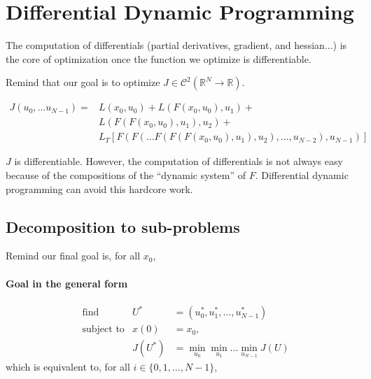 \documentclass{report}
\begin{document}
\chapter{Differential Dynamic Programming}

The computation of differentials (partial derivatives, gradient, and hessian...) is the core of optimization once the function we optimize is differentiable.

Remind that our goal is to optimize $J \in \mathscr{C}^2 (\mathbb{R}^N \to \mathbb{R})$.

\begin{equation}
\begin{split}
J(u_0, ...u_{N-1}) = &L(x_0, u_0) + L(F(x_0, u_0), u_1) + \\
	&L(F(F(x_0, u_0), u_1), u_2) + \\
	&L_T[F(F(...F(F(F(x_0, u_0), u_1), u_2), ..., u_{N-2}) ,u_{N-1})]
\end{split}
\end{equation}

$J$ is differentiable. However, the computation of differentials is not always easy because of the compositions of the ``dynamic system'' of $F$. Differential dynamic programming can avoid this hardcore work.

\section{Decomposition to sub-problems}
Remind our final goal is, for all $x_0$,

\subsubsection{Goal in the general form}

\begin{equation}
\begin{aligned}
&\text{find}             &U^* & = (u_0^*, u_1^*, ... , u_{N-1}^*) \\
&\text{subject to}       &x(0)      &= x_0,  \\
&							      &J(U^*)  &= \min_{u_0} \min_{u_1} ... \min_{u_{N-1}} J(U)
\end{aligned}
\end{equation}
%
which is equivalent to, for all $i\in \{0, 1, ..., N-1\}$,
\end{document}
